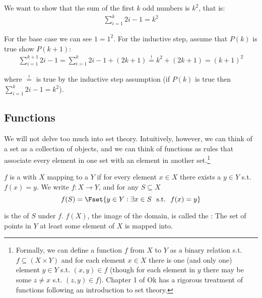 \documentclass{article}
\begin{document}
\begin{enumerate}
    \begin{example}
      We want to show that the sum of the first $k$ odd numbers is $k^2$, that is:
      \begin{align*}
        \sum^{k}_{i = 1} 2i - 1 = k^2
      \end{align*}

      For the base case we can see $1 = 1^2$. For the inductive step, assume that $P(k)$ is true show $P(k + 1)$:
      \begin{align*}
        \sum^{k + 1}_{i = 1} 2i - 1
        = \sum^{k}_{i = 1} 2i - 1 + (2k + 1)
        \stackrel{!}{=} k^2 + (2k + 1)
        = (k + 1)^2
      \end{align*}

      where $\stackrel{!}{=}$ is true by the inductive step assumption (if $P(k)$ is true then $\sum^{k}_{i = 1} 2i - 1 = k^2$).
    \end{example}
\end{enumerate}

\subsection{Functions}
\label{sub:functions}

We will not delve too much into set theory. Intuitively, however, we can think of a set as a collection of objects, and we can think of functions as rules that associate every element in one set with an element in another set.\footnote{Formally, we can define a function $f$ from $X$ to $Y$ as a binary relation s.t. $f \subseteq (X \times Y)$ and for each element $x \in X$ there is one (and only one) element $y \in Y$ s.t. $(x, y) \in f$ (though for each element in $y$ there may be some $z \ne x$ s.t. $(z, y) \in f$). Chapter 1 of Ok has a rigorous treatment of functions following an introduction to set theory.}
\begin{definition}[function]\label{def:lecture1_functions}
  $f$ is a  with  $X$ mapping to a  $Y$ if for every element $x \in X$ there exists a $y \in Y$ s.t. $f(x) = y$. We write $f: X \to Y$, and for any $S \subseteq X$
  \[
    f(S)
    =
    \Fset{
      y \in Y: \exists x \in S ~~ \text{s.t.} ~~ f(x) = y
    }
  \]

  is the  of $S$ under $f$. $f(X)$, the image of the domain, is called the : The set of points in $Y$ at least some element of $X$ is mapped into.
\end{definition}
\end{document}
